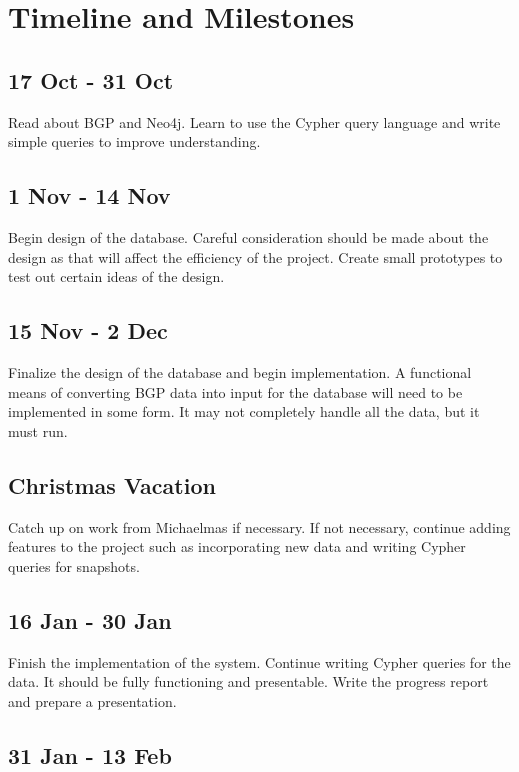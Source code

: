 \section*{Timeline and Milestones}

\subsection*{17 Oct - 31 Oct}

Read about BGP and Neo4j. Learn to use the Cypher query language and write simple queries to improve understanding. 

\subsection*{1 Nov - 14 Nov}

Begin design of the database. Careful consideration should be made about the design as that will affect the efficiency of the project. Create small prototypes to test out certain ideas of the design. 

\subsection*{15 Nov - 2 Dec}

Finalize the design of the database and begin implementation. A functional means of converting BGP data into input for the database will need to be implemented in some form. It may not completely handle all the data, but it must run. 

\subsection*{Christmas Vacation}

Catch up on work from Michaelmas if necessary. If not necessary, continue adding features to the project such as incorporating new data and writing Cypher queries for snapshots.

\subsection*{16 Jan - 30 Jan}

Finish the implementation of the system. Continue writing Cypher queries for the data. It should be fully functioning and presentable. Write the progress report and prepare a presentation.

\subsection*{31 Jan - 13 Feb}

